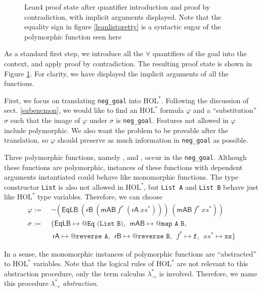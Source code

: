 \begin{figure}
  \begin{CenteredBox}
    
  \end{CenteredBox}
  \caption{Lean4 proof state after quantifier introduction and proof by contradiction, with implicit arguments displayed.
    Note that the equality sign in figure \ref{leanlistpretty} is a syntactic sugar of
    the polymorphic function {\usebox{\vEq}} seen here}
  \label{leanlistexplicit}
\end{figure}

As a standard first step, we introduce all the $\forall$ quantifiers
of the goal into the context, and apply proof by contradiction. The resulting proof state
is shown in Figure \ref{leanlistexplicit}.
For clarity, we have displayed the implicit arguments of all the functions.

First, we focus on translating \texttt{neg\_goal} into $\text{HOL}^*$. Following the
discussion of sect. \ref{subencmon}, we would like to find an $\text{HOL}^*$ formula $\varphi$
and a ``substitution'' $\sigma$ such that the image of $\varphi$ under $\sigma$ is \texttt{neg\_goal}.
Features not allowed in $\varphi$ include polymorphic. We also want the problem to
be provable after the translation, so $\varphi$ should preserve as much information in
\texttt{neg\_goal} as possible.

Three polymorphic functions, namely \usebox{\vEq}, \usebox{\vmap} and \usebox{\vrev}, occur in the \texttt{neg\_goal}.
Although these functions are polymorphic, instances of these functions
with dependent arguments instantiated could behave like monomorphic functions.
The type constructor \texttt{List} is also not allowed in $\text{HOL}^*$, but
\texttt{List A} and \texttt{List B} behave just like $\text{HOL}^*$ type variables.
Therefore, we can choose
$$\begin{aligned}
\varphi := & \ \neg (\mathsf{EqLB} \ (\mathsf{rB} \ (\mathsf{mAB} \ f^* \ (\mathsf{rA} \ \mathit{xs}^*))) \ (\mathsf{mAB} \ f^* \ \mathit{xs}^*)) \\
\sigma := & \ \{\mathsf{EqLB} \mapsto \texttt{@Eq (List B)}, \ \ \mathsf{mAB} \mapsto \texttt{@map A B}, \\
          & \ \ \mathsf{rA} \mapsto \texttt{@reverse A}, \ \ \mathsf{rB} \mapsto \texttt{@reverse B}, \ \ f^* \mapsto \texttt{f}, \ \ \mathit{xs}^* \mapsto \texttt{xs}\}
\end{aligned}$$

In a sense, the monomorphic instances of polymorphic functions are ``abstracted'' to $\text{HOL}^*$
variables. Note that the logical rules of $\text{HOL}^*$ are not relevant to this abstraction procedure, only
the term calculus $\lambda_\to^*$ is involved. Therefore, we name this procedure $\lambda_\to^*$ \textit{abstraction}.

